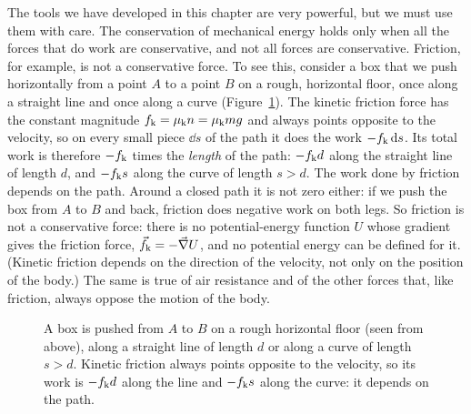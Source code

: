 \documentclass[11pt,a4paper]{article}
\begin{document}
The tools we have developed in this chapter are very powerful, but we must use them with care. The
conservation of mechanical energy holds only when all the forces that do work are conservative, and
not all forces are conservative. Friction, for example, is not a conservative force. To see this,
consider a box that we push horizontally from a point $A$ to a point $B$ on a rough, horizontal
floor, once along a straight line and once along a curve (Figure~\ref{fig:friction-paths}). The
kinetic friction force has the constant magnitude $f_{\mathrm{k}} = \mu_{\mathrm{k}} n = \mu_{\mathrm{k}} mg$ and always points opposite
to the velocity, so on every small piece $\dd s$ of the path it does the work $-f_{\mathrm{k}}\,\mathrm{d} s$.
Its total work is therefore $-f_{\mathrm{k}}$ times the \emph{length} of the path: $-f_{\mathrm{k}} d$ along the
straight line of length $d$, and $-f_{\mathrm{k}} s$ along the curve of length $s > d$. The work done by
friction depends on the path. Around a closed path it is not zero either: if we push the box from
$A$ to $B$ and back, friction does negative work on both legs. So friction is not a conservative
force: there is no potential-energy function $U$ whose gradient gives the friction force,
$\vec{f}_{\mathrm{k}} = -\vec{\nabla}U$, and no potential energy can be defined for it. (Kinetic friction
depends on the direction of the velocity, not only on the position of the body.) The same is true
of air resistance and of the other forces that, like friction, always oppose the motion of the body.

\begin{figure}[ht]
\centering
{}
\caption{A box is pushed from $A$ to $B$ on a rough horizontal floor (seen from above), along a
straight line of length $d$ or along a curve of length $s > d$. Kinetic friction always points
opposite to the velocity, so its work is $-f_{\mathrm{k}} d$ along the line and $-f_{\mathrm{k}} s$ along the
curve: it depends on the path.}\label{fig:friction-paths}
\end{figure}
\end{document}
